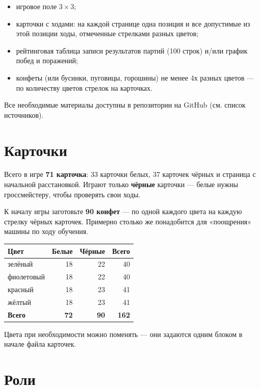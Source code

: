\documentclass[12pt,a4paper]{article}
\begin{document}
\begin{itemize}[nosep]
\item игровое поле $3\times3$;
\item карточки с ходами:
      на каждой странице одна позиция и все допустимые из этой позиции ходы, отмеченные стрелками разных цветов;
\item рейтинговая таблица записи результатов партий (100 строк) и/или график побед и поражений;
\item конфеты (или бусинки, пуговицы, горошины) не менее 4х разных цветов --- по количеству цветов стрелок на карточках.
\end{itemize}

Все необходимые материалы доступны в репозитории на GitHub (см. список источников).


\section*{Карточки}

Всего в игре \textbf{71 карточка}: 33 карточки белых, 37 карточек чёрных и страница с начальной расстановкой.
Играют только \textbf{чёрные} карточки --- белые нужны гроссмейстеру, чтобы проверять свои ходы.

К началу игры заготовьте \textbf{90 конфет} --- по одной каждого цвета на каждую стрелку чёрных карточек.
Примерно столько же понадобится для «поощрения» машины по ходу обучения.

\begin{center}
\begin{tabular}{|l|r|r|r|}
\hline
\textbf{Цвет} & \textbf{Белые} & \textbf{Чёрные} & \textbf{Всего} \\
\hline
зелёный   & 18 & 22 & 40 \\
фиолетовый & 18 & 22 & 40 \\
красный   & 18 & 23 & 41 \\
жёлтый    & 18 & 23 & 41 \\
\hline
\textbf{Всего} & \textbf{72} & \textbf{90} & \textbf{162} \\
\hline
\end{tabular}
\end{center}

Цвета при необходимости можно поменять --- они задаются одним блоком в начале файла карточек.


\section*{Роли}
\end{document}
